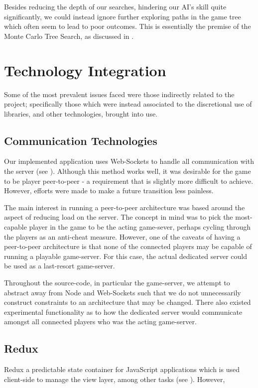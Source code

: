 \documentclass{standalone}
\begin{document}
		Besides reducing the depth of our searches, hindering our AI's skill quite significantly, we could instead ignore further exploring paths in the game tree which often seem to lead to poor outcomes. This is essentially the premise of the Monte Carlo Tree Search, as discussed in .

	\section{Technology Integration}
		Some of the most prevalent issues faced were those indirectly related to the project; specifically those which were instead associated to the discretional use of libraries, and other technologies, brought into use.

		\subsection{Communication Technologies}
			Our implemented application uses Web-Sockets to handle all communication with the server (see ). Although this method works well, it was desirable for the game to be player peer-to-peer - a requirement that is slightly more difficult to achieve. However, efforts were made to make a future transition less painless.

			The main interest in running a peer-to-peer architecture was based around the aspect of reducing load on the server. The concept in mind was to pick the most-capable player in the game to be the acting game-sever, perhaps cycling through the players as an anti-cheat measure. However, one of the caveats of having a peer-to-peer architecture is that none of the connected players may be capable of running a playable game-server. For this case, the actual dedicated server could be used as a last-resort game-server.

		 	Throughout the source-code, in particular the game-server, we attempt to abstract away from Node and Web-Sockets such that we do not unnecessarily construct constraints to an architecture that may be changed. There also existed experimental functionality as to how the dedicated server would communicate amongst all connected players who was the acting game-server.

		\subsection{Redux}
			Redux a predictable state container for JavaScript applications which is used client-side to manage the view layer, among other tasks (see ). However,
\end{document}
